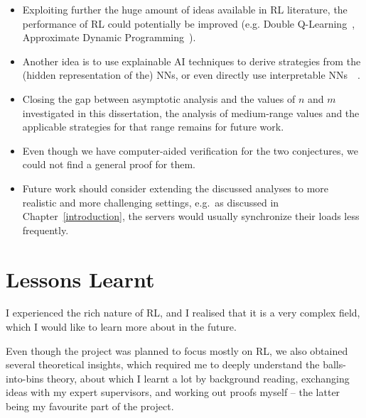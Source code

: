 \begin{itemize}
    \item Exploiting further the huge amount of ideas available in RL literature, the performance of RL could potentially be improved (e.g. Double Q-Learning~\cite{hasselt2010doubleqlearning}, Approximate Dynamic Programming~\cite{bellman1959approximatedp}).
    \item Another idea is to use explainable AI techniques to derive strategies from the (hidden representation of the) NNs, or even directly use interpretable NNs~\cite{vacareanu2022explainableAI1}~\cite{tang2022explainableAI2}.
    \item Closing the gap between asymptotic analysis and the values of $n$ and $m$ investigated in this dissertation, the analysis of medium-range values and the applicable strategies for that range remains for future work.
    \item Even though we have computer-aided verification for the two conjectures, we could not find a general proof for them.
    \item Future work should consider extending the discussed analyses to more realistic and more challenging settings, e.g.\ as discussed in Chapter~\ref{introduction}, the servers would usually synchronize their loads less frequently.
\end{itemize}

 

\iffalse %
It is definitely possible to try improving RL, and hopefully get closer to the optimal strategies. For example, double learning~\cite{hasselt2010doubleqlearning}, which argues that vanilla (deep) Q-Learning overestimates the action values by under the hood using $\mathbb{E}[\max_a(Q(s,a)]$ instead of $\max_a(\mathbb{E}[Q(s,a)])$. Another idea is approximate dynamic programming \cite{bellman1959approximatedp} which can potentially make better use of the fully known environment for the agent.
\fi






\section{Lessons Learnt}

I experienced the rich nature of RL, and I realised that it is a very complex field, which I would like to learn more about in the future. 

Even though the project was planned to focus mostly on RL, we also obtained several theoretical insights, which required me to deeply understand the balls-into-bins theory, about which I learnt a lot by background reading, exchanging ideas with my expert supervisors, and working out proofs myself -- the latter being my favourite part of the project.

